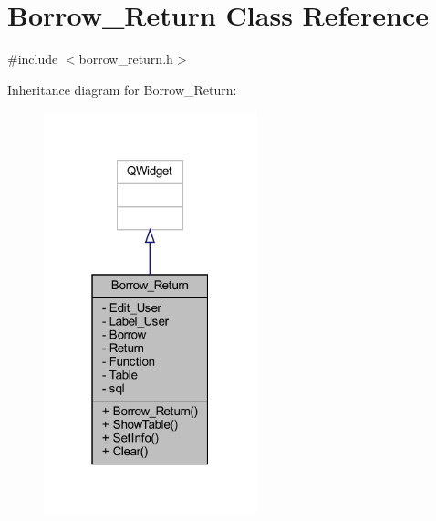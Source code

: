 \hypertarget{class_borrow___return}{}\section{Borrow\+\_\+\+Return Class Reference}
\label{class_borrow___return}


{\ttfamily \#include $<$borrow\+\_\+return.\+h$>$}



Inheritance diagram for Borrow\+\_\+\+Return\+:
\nopagebreak
\begin{figure}[H]
\begin{center}
\leavevmode
\includegraphics[width=175pt]{class_borrow___return__inherit__graph}
\end{center}
\end{figure}


